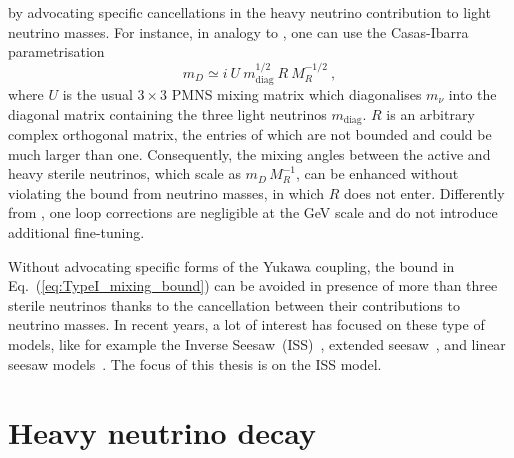 by advocating specific cancellations in the heavy neutrino contribution to light neutrino masses.
For instance, in analogy to , one can use the Casas-Ibarra parametrisation~\cite{Casas:2001sr}
\begin{equation}
	\label{eq:CasasIbarra}
	m_D \simeq i \ U \ m_\text{diag}^{1/2}\ R\ M_R^{-1/2}\ ,
\end{equation}
where $U$ is the usual $3\times 3$ PMNS mixing matrix %
which diagonalises $m_\nu$ into the diagonal matrix containing the three light neutrinos $m_\text{diag}$.
$R$ is an arbitrary complex orthogonal matrix, the entries of which are not bounded and could be much larger than one.
Consequently, the mixing angles between the active and heavy sterile neutrinos, %
which scale as $m_D\, M_{R}^{-1}$, can be enhanced without violating the bound from neutrino masses, %
in which $R$ does not enter.
Differently from , one loop corrections are negligible at the GeV scale and do not introduce additional fine-tuning. 

Without advocating specific forms of the Yukawa coupling, %
the bound in Eq.~(\ref{eq:TypeI_mixing_bound}) can be avoided in presence of more than three sterile neutrinos %
thanks to the cancellation between their contributions to neutrino masses.
In recent years, a lot of interest has focused on these type of models, like for example %
the Inverse Seesaw~(ISS)~\cite{Mohapatra:1986bd, GonzalezGarcia:1988rw}, extended seesaw~\cite{Barr:2003nn}, %
and linear seesaw models~\cite{Malinsky:2005bi,Kang:2006sn}.
The focus of this thesis is on the ISS model.
\fi





\section{Heavy neutrino decay}
\label{sec:decay}


%

